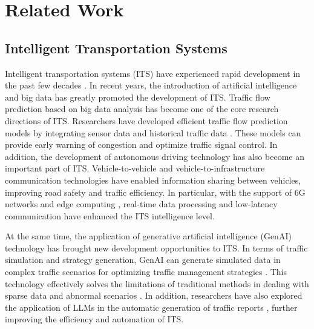 \section{Related Work}
\label{sec2}
	\subsection{Intelligent Transportation Systems} 
	Intelligent transportation systems (ITS) have experienced rapid development in the past few decades \cite{RW1, RW2, RW3}. In recent years, the introduction of artificial intelligence and big data has greatly promoted the development of ITS. Traffic flow prediction \cite{RW6, RW7} based on big data analysis \cite{RW5} has become one of the core research directions of ITS. Researchers have developed efficient traffic flow prediction models by integrating sensor data and historical traffic data \cite{RW8, RW9, itsappen4}. These models can provide early warning of congestion and optimize traffic signal control. In addition, the development of autonomous driving technology has also become an important part of ITS. Vehicle-to-vehicle \cite{VV} and vehicle-to-infrastructure \cite{VI} communication technologies \cite{tbjz2, tbjz3} have enabled information sharing between vehicles, improving road safety and traffic efficiency. In particular, with the support of 6G networks \cite{RW2, itsappen2} and edge computing \cite{RW1, RW4}, real-time data processing \cite{RT, itsappen5} and low-latency communication \cite{LL} have enhanced the ITS intelligence level.
	
	At the same time, the application of generative artificial intelligence (GenAI) technology \cite{LLaMA22023, GLM42024} has brought new development opportunities to ITS. In terms of traffic simulation and strategy generation, GenAI can generate simulated data in complex traffic scenarios for optimizing traffic management strategies \cite{tra3, tra4}. This technology effectively solves the limitations of traditional methods in dealing with sparse data and abnormal scenarios \cite{TRS1, TRS2}. In addition, researchers have also explored the application of LLMs in the automatic generation of traffic reports \cite{TRS3}, further improving the efficiency and automation of ITS.
	
	
